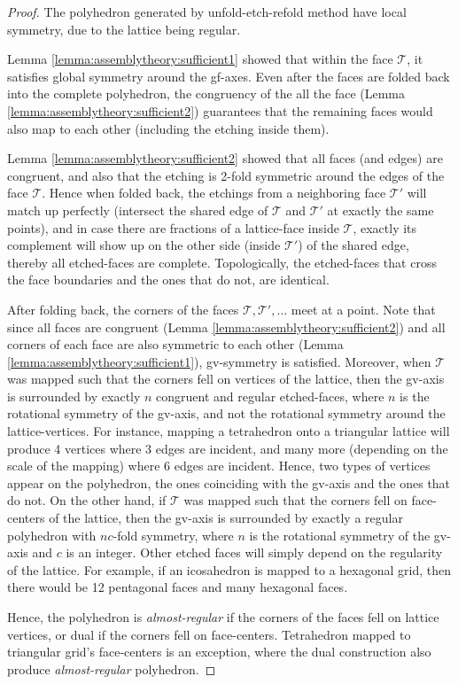 \documentclass[11pt]{article}
\newcommand{\1}{\mathds{1}}
\begin{document}
\begin{proof}
 The polyhedron generated by unfold-etch-refold method have local symmetry, due to the lattice being regular.
 
 Lemma \ref{lemma:assemblytheory:sufficient1} showed that within the face $\mathcal{T}$, it satisfies global symmetry around the gf-axes. Even after the faces are folded back into the complete polyhedron, the congruency of the all the face (Lemma \ref{lemma:assemblytheory:sufficient2}) guarantees that the remaining faces would also map to each other (including the etching inside them). 

 Lemma \ref{lemma:assemblytheory:sufficient2} showed that all faces (and edges) are congruent, and also that the etching is 2-fold symmetric around the edges of the face $\mathcal{T}$. Hence when folded back, the etchings from a neighboring face $\mathcal{T}'$ will match up perfectly (intersect the shared edge of $\mathcal{T}$ and $\mathcal{T}'$ at exactly the same points), and in case there are fractions of a lattice-face inside $\mathcal{T}$, exactly its complement will show up on the other side (inside $\mathcal{T}'$) of the shared edge, thereby all etched-faces are complete. Topologically, the etched-faces that cross the face boundaries and the ones that do not, are identical. 

 After folding back, the corners of the faces $\mathcal{T}, \mathcal{T}', \ldots$ meet at a point. Note that since all faces are congruent (Lemma \ref{lemma:assemblytheory:sufficient2}) and all corners of each face are also symmetric to each other (Lemma \ref{lemma:assemblytheory:sufficient1}), gv-symmetry is satisfied. Moreover, when $\mathcal{T}$ was mapped such that the corners fell on vertices of the lattice, then the gv-axis is surrounded by exactly $n$ congruent and regular etched-faces, where $n$ is the rotational symmetry of the gv-axis, and not the rotational symmetry around the lattice-vertices. For instance, mapping a tetrahedron onto a triangular lattice will produce 4 vertices where 3 edges are incident, and many more (depending on the scale of the mapping) where 6 edges are incident. Hence, two types of vertices appear on the polyhedron, the ones coinciding with the gv-axis and the ones that do not. On the other hand, if $\mathcal{T}$ was mapped such that the corners fell on face-centers of the lattice, then the gv-axis is surrounded by exactly a regular polyhedron with $nc$-fold symmetry, where $n$ is the rotational symmetry of the gv-axis and $c$ is an integer. Other etched faces will simply depend on the regularity of the lattice. For example, if an icosahedron is mapped to a hexagonal grid, then there would be 12 pentagonal faces and many hexagonal faces. 

 Hence, the polyhedron is \emph{almost-regular} if the corners of the faces fell on lattice vertices, or dual if the corners fell on face-centers. Tetrahedron mapped to triangular grid's face-centers is an exception, where the dual construction also produce \emph{almost-regular} polyhedron. 
\end{proof}
\end{document}
